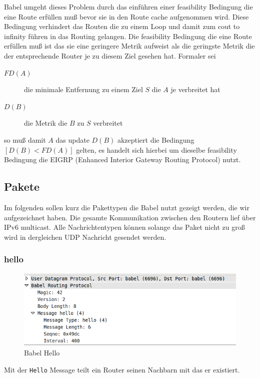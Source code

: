 \documentclass[10pt]{scrartcl}
\begin{document}
	Babel umgeht dieses Problem durch das einführen einer feasibility Bedingung die eine Route erfüllen muß bevor sie  in den Route cache aufgenommen wird. Diese Bedingung verhindert das Routen die zu einem Loop und damit zum cout to infinity führen in das Routing gelangen.
	Die feasibility Bedingung die eine Route erfüllen muß ist das sie eine geringere Metrik aufweist als die geringste Metrik die der entsprechende Router je zu diesem Ziel gesehen hat. Formaler sei 
	\begin{description}
		\item[$FD(A)$] die minimale Entfernung zu einem Ziel $S$ die $A$ je verbreitet hat
		\item[$D(B)$] die Metrik die $B$ zu $S$ verbreitet
	\end{description} 
	so muß damit $A$ das update $D(B)$ akzeptiert die Bedingung $[D(B) < FD(A)]$ gelten, es handelt sich hierbei um dieselbe feasibility Bedingung die EIGRP (Enhanced Interior Gateway Routing Protocol) nutzt.
	
	\subsection{Pakete}
	Im folgenden sollen kurz die Pakettypen die Babel nutzt gezeigt werden, die wir aufgezeichnet haben. Die gesamte Kommunikation zwischen den Routern lief über IPv6 multicast. Alle Nachrichtentypen können solange das Paket nicht zu groß wird in dergleichen UDP Nachricht gesendet werden.
	
	\subsubsection{hello}
	\begin{figure}[H]
        \centering
                \includegraphics[width=\textwidth]{img/babel_hello}
        \caption{Babel Hello}
        \label{img:testAufbau}
	\end{figure}	
	Mit der \verb!Hello! Message teilt ein Router seinen Nachbarn mit das er existiert.	
	
\end{document}
